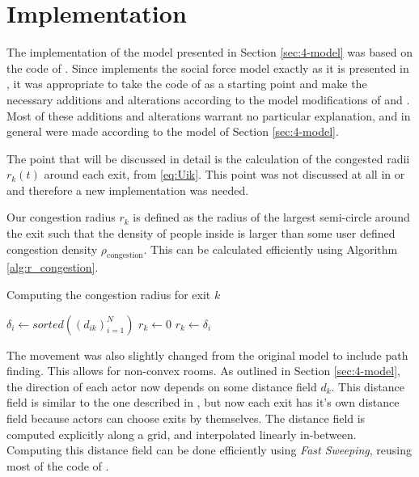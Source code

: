 \section{Implementation} \label{sec:5-implementation}
The implementation of the model presented in Section \ref{sec:4-model} was based on the code of \cite{Hardmeier2012}. Since \cite{Hardmeier2012} implements the social force model exactly as it is presented in \cite{Helbing2000}, it was appropriate to take the code of \cite{Hardmeier2012} as a starting point and make the necessary additions and alterations according to the model modifications of \cite{Zainuddin2010} and \cite{Wang2016}. Most of these additions and alterations warrant no particular explanation, and in general were made according to the model of Section \ref{sec:4-model}.

The point that will be discussed in detail is the calculation of the congested radii $r_k(t)$ around each exit, from \eqref{eq:Uik}. This point was not discussed at all in \cite{Zainuddin2010} or \cite{Wang2016} and therefore a new implementation was needed.

Our congestion radius $r_k$ is defined as the radius of the largest semi-circle around the exit such that the density of people inside is larger than some user defined congestion density $\rho_{\textrm{congestion}}$. This can be calculated efficiently using Algorithm \ref{alg:r_congestion}.

\begin{algorithm}
	\caption{Computing the congestion radius for exit $k$}
	\begin{algorithmic}
		\State $\delta_i \gets sorted((d_{ik})_{i=1}^{N})$   
		\State $r_k \gets 0$
				\State $r_k \gets \delta_i$
			\Else
				\State {}
			\EndIf
		\EndFor{}
		\State {}
	\end{algorithmic}
	\label{alg:r_congestion}
\end{algorithm}

The movement was also slightly changed from the original model to include path finding. This allows for non-convex rooms. As outlined in Section \ref{sec:4-model}, the direction of each actor now depends on some distance field $d_k$. This distance field is similar to the one described in \cite{Hardmeier2012}, but now each exit has it's own distance field because actors can choose exits by themselves. The distance field is computed explicitly along a grid, and interpolated linearly in-between. Computing this distance field can be done efficiently using \emph{Fast Sweeping}, reusing most of the code of \cite{Hardmeier2012}. 

